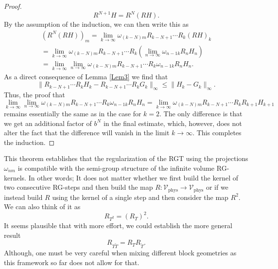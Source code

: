 \documentclass{article}
\newcommand{\phys}{\mathrm{phys}}
\begin{document}
\begin{proof}
    \begin{equation}
        R^{N+1}H=R^N(RH).
    \end{equation}
    By the assumption of the induction, we can then write this as
    \begin{align}
        (R^N(RH))_m=\lim_{k\to\infty}\omega_{(k-N)m}R_{k-N+1}\cdots R_{k}(RH)_k\nonumber\\
        =\lim_{k\to\infty}\omega_{(k-N)m}R_{k-N+1}\cdots R_{k}(\lim_{n\to\infty}\omega_{n-1k}R_nH_n)\\
        =\lim_{k\to\infty}\lim_{n\to\infty}\omega_{(k-N)m}R_{k-N+1}\cdots R_{k}\omega_{n-1k}R_nH_n.\nonumber
    \end{align}
    As a direct consequence of Lemma \ref{Lem3} we find that
    \begin{equation}
        \|R_{k-N+1}\cdots R_{k}H_k-R_{k-N+1}\cdots R_{k}G_k\|_\infty\leq\|H_k-G_k\|_\infty.
    \end{equation}
    Thus, the proof that
    \begin{equation}
        \lim_{k\to\infty}\lim_{n\to\infty}\omega_{(k-N)m}R_{k-N+1}\cdots R_{k}\omega_{n-1k}R_nH_n=\lim_{k\to\infty}\omega_{(k-N)m}R_{k-N+1}\cdots R_{k}R_{k+1}H_{k+1}
    \end{equation}
    remains essentially the same as in the case for $k=2$. The only difference is that we get an additional factor of $b^N$ in the final estimate, which, however, does not alter the fact that the difference will vanish in the limit $k\to\infty$. This completes the induction.
\end{proof}

This theorem establishes that the regularization of the RGT using the projections $\omega_{nm}$ is compatible with the semi-group structure of the infinite volume RG-kernels. In other words; It does not matter whether we first build the kernel of two consecutive RG-steps and then build the map $R:\mathcal{V}_\phys\to\mathcal{V}_\phys$ or if we instead build $R$ using the kernel of a single step and then consider the map $R^2$. We can also think of it as
\begin{equation}
    R_{T^2}=(R_T)^2.
\end{equation}
It seems plausible that with more effort, we could establish the more general result
\begin{equation}
    R_{T\tilde T}=R_{T}R_{\tilde T}.
\end{equation}
Although, one must be very careful when mixing different block geometries as this framework so far does not allow for that.
\end{document}
